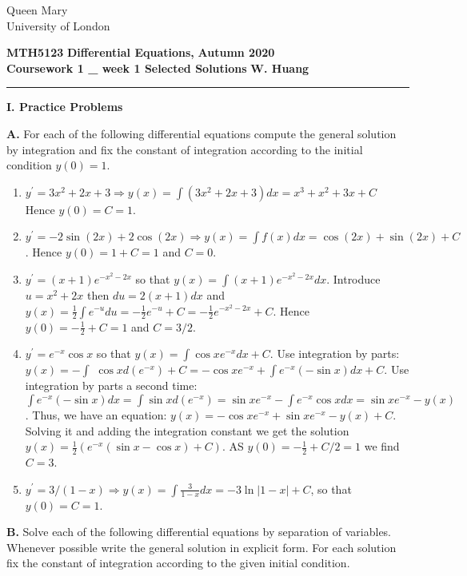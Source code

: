 \documentclass[11pt,a4paper,twoside]{article}
\begin{document}
	\begin{singlespace}
		\begin{center}
			\Huge Queen Mary\\
			\LARGE University of London
		\end{center}
		\Large \textbf{MTH5123} \hfill \Large \textbf{Differential Equations,} \hfill \Large \textbf{Autumn 2020}\\
		\large \textbf{Coursework 1 \_ week 1 Selected Solutions} \hfill \large \textbf{W. Huang}
		\rule{\textwidth}{0.4pt}
	\end{singlespace}
	\textbf{I. Practice Problems}\par
	\textbf{A.} For each of the following differential equations compute the general solution by integration and fix the constant of integration according to the initial condition $y(0) = 1$.
	\begin{enumerate}[\bfseries 1)]
		\item $
					y^\prime
					= 3x^2 + 2x + 3 \Rightarrow
					y(x)
					= \int (3x^2 + 2x + 3)dx
					= x^3 + x^2 + 3x + C
					$
					Hence $y(0) = C = 1$.
		\item $
					y^\prime 
					= −2 \sin(2x) + 2 \cos(2x) \Rightarrow 
					y(x)
					= \int f(x)dx
					= \cos (2x) + \sin (2x) + C
					$.
					Hence $y(0) = 1 + C = 1$ and $C = 0$.
		\item $
					y^\prime = (x + 1)e^{−x^2−2x}
					$
					so that
					$
					y(x) = \int (x + 1)e^{−x^2−2x} dx
					$.
					Introduce $u = x^2 + 2x$ then $du = 2(x + 1) dx$ and $y(x) = \frac{1}{2}\int e^{-u}du =-\frac{1}{2} e^{-u} + C = -\frac{1}{2}e^{-x^2-2x} + C$. Hence $y(0) = -\frac{1}{2} + C = 1$ and $C = 3/2$.
		\item $y^\prime = e^{-x}\cos x$ so that $y(x) = \int \cos xe^{-x}dx + C$. Use integration by parts: $y(x) = -\int $ $\cos x d(e^{-x}) + C = -\cos xe^{-x} + \int e^{-x}(-\sin x)dx + C$. Use integration by parts a second time: $\int e^{-x}(-\sin x)dx = \int \sin x d(e^{-x}) = \sin xe^{-x} - \int e^{-x}\cos xdx = \sin x e^{-x} - y(x)$. Thus, we have an equation: $y(x) = -\cos x e^{-x} + \sin xe^{-x} - y(x) + C$. Solving it and adding the integration constant we get the solution $y(x) = \frac{1}{2}(e^{-x}(\sin x - \cos x) + C)$. AS $y(0) = -\frac{1}{2}+C/2=1$ we find $C = 3$.
		\item $y^\prime = 3/(1 − x) \Rightarrow y(x) = \int \frac{3}{1-x}dx = -3\ln \left\lvert 1-x \right\rvert + C$, so that $y(0) = C = 1$.
	\end{enumerate}
	\textbf{B.} Solve each of the following differential equations by separation of variables. Whenever possible write the general solution in explicit form. For each solution fix the constant of integration according to the given initial condition.
\end{document}
